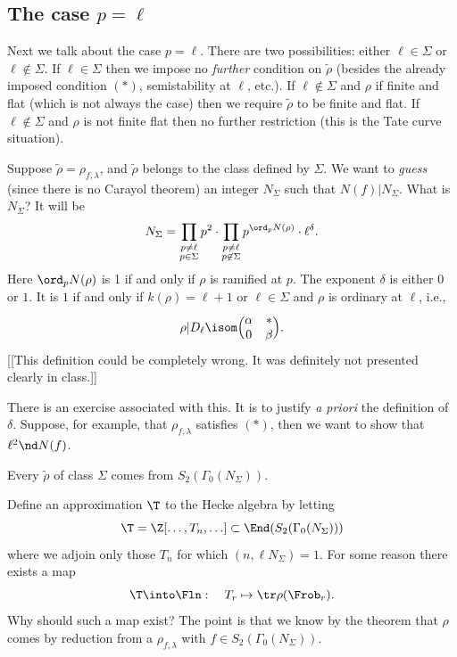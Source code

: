 \documentclass{report}
\begin{document}
\subsection{The case $p=\ell$}
Next we talk about the case $p=\ell$. There are two possibilities:
either $\ell\in\Sigma$ or $\ell\not\in\Sigma$. If $\ell\in\Sigma$ then
we impose no {\em further} condition on $\tilde{\rho}$ (besides the already
imposed condition $(*)$, semistability at $\ell$, etc.). If $\ell\not\in\Sigma$
and $\rho$ if finite and flat (which is not always the case) then we require
$\tilde{\rho}$ to be finite and flat. If $\ell\not\in\Sigma$ and $\rho$
is not finite flat then no further restriction (this is the Tate curve
situation).

Suppose $\tilde{\rho}=\rho_{f,\lambda}$, and $\tilde{\rho}$ belongs
to the class defined by $\Sigma$. We want to {\em guess} (since there
is no Carayol theorem) an integer $N_{\Sigma}$ such that
$N(f)|N_{\Sigma}$. What is $N_{\Sigma}$? It will be
$$N_{\Sigma}=\prod_{\substack{p\neq\ell\\p\in\Sigma}} p^2
            \cdot \prod_{\substack{p\neq\ell\\p\not\in\Sigma}}
                         p^{\ord_p N(\rho)}
            \cdot \ell^{\delta}.$$
Here $\ord_p N(\rho)$ is 1 if and only if $\rho$ is ramified at $p$.
The exponent $\delta$ is either $0$ or $1$. It is $1$ if and only if
$k(\rho)=\ell+1$ or $\ell\in\Sigma$ and $\rho$ is ordinary at $\ell$,
i.e., $$\rho|D_{\ell}\isom
         \Bigl(\begin{matrix}\alpha&*\\0&\beta\end{matrix}\Bigr).$$
[[This definition could be completely wrong. It was definitely not
presented clearly in class.]]

There is an exercise associated with this. It is to justify {\em a priori}
the definition of $\delta$. Suppose, for example, that $\rho_{f,\lambda}$
satisfies $(*)$, then we want to show that $\ell^2\nd N(f)$.

\begin{theorem}
Every $\tilde{\rho}$ of class $\Sigma$ comes from
$S_2(\Gamma_0(N_{\Sigma}))$. \end{theorem}

Define an approximation $\T$ to the Hecke algebra by
letting
$$\T=\Z[\ldots,T_n,\ldots]\subset\End(S_2(\Gamma_0(N_{\Sigma})))$$
where we adjoin only those $T_n$ for which $(n,\ell N_{\Sigma})=1$.
For some reason there exists a map
$$\T\into\Fln: \quad T_r\mapsto \tr \rho(\Frob_r).$$
Why should such a map exist?
The point is that we know by the theorem that $\rho$ comes by reduction
from a $\rho_{f,\lambda}$ with $f\in S_2(\Gamma_0(N_{\Sigma}))$.
\end{document}
